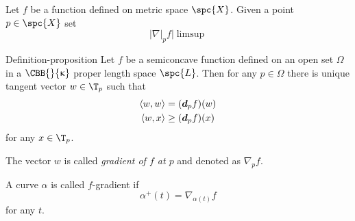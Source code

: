 Let $f$ be a function defined on metric space $\spc{X}$.
Given a point $p\in \spc{X}$ set
\[|\nabla|_pf|\limsup \]

\begin{thm}{Definition-proposition}
Let $f$ be a semiconcave function defined on an open set $\Omega$ in a  $\CBB{}{\kappa}$ proper length space $\spc{L}$.
Then for any $p\in \Omega$ there is unique tangent vector $w\in\T_p$ such that
\begin{align*}
\<w,w\>&=(\d_pf)(w)
\\
\<w,x\>&\ge(\d_pf)(x)
\end{align*}
for any $x\in \T_p$.

The vector $w$ is called \emph{gradient of $f$ at $p$} and denoted as $\nabla_pf$.
\end{thm}

A curve $\alpha$ is called $f$-gradient if 
\[\alpha^+(t)=\nabla_{\alpha(t)}f\]
for any $t$.
